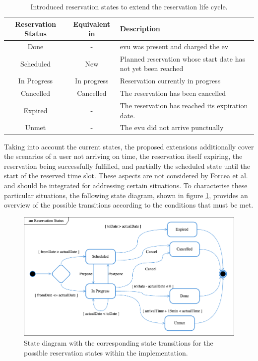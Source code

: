 \begingroup
\setlength{\tabcolsep}{10pt} %
\renewcommand{\arraystretch}{1.5} %
\begin{table}[h]
    \centering
    \caption{Introduced reservation states to extend the reservation life cycle.}
    \begin{tabular}{c|c|m{7cm}}
        Reservation Status & Equivalent in \cite{flocea_electric_2022} & Description \\ \hline
        Done & - & \acrshort{evu} was present and charged the \acrshort{ev} \\
        Scheduled & New & Planned reservation whose start date has not yet been reached \\
        In Progress & In progress & Reservation currently in progress \\
        Cancelled & Cancelled & The reservation has been cancelled \\
        Expired & - & The reservation has reached its expiration date. \\
        Unmet & - & The \acrshort{evu} did not arrive punctually
    \end{tabular}
    \label{tab:reservation-states}
\end{table}
\endgroup

\noindent Taking into account the current states, the proposed extensions additionally cover the scenarios of a user not arriving on time, the reservation itself expiring, the reservation being successfully fulfilled, and partially the scheduled state until the start of the reserved time slot. 
These aspects are not considered by Forcea et al. and should be integrated for addressing certain situations.
To characterise these particular situations, the following state diagram, shown in figure \ref{fig:reservation-states}, provides an overview of the possible transitions according to the conditions that must be met.

\begin{figure}[h]
    \centering
    \includegraphics[scale=0.4]{resources/images/main/5_design/ReservationStatusStates.png}
    \caption{State diagram with the corresponding state transitions for the possible reservation states within the implementation.}
    \label{fig:reservation-states}
\end{figure}

